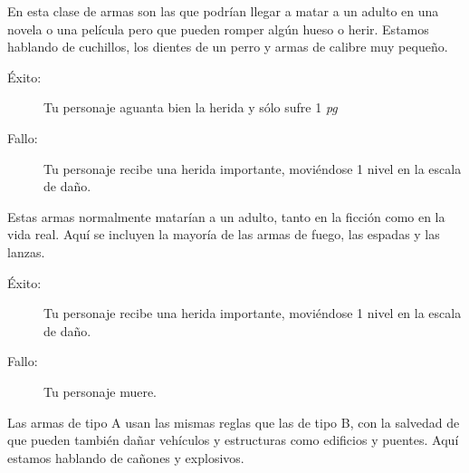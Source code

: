 
En esta clase de armas son las que podrían llegar a matar a un adulto en una novela
o una película pero que pueden romper algún hueso o herir. Estamos hablando de cuchillos, los dientes
de un perro y armas de calibre muy pequeño.

\begin{description}

\item[Éxito:] Tu personaje aguanta bien la herida y sólo sufre 1 \emph{pg}

\item[Fallo:] Tu personaje recibe una herida importante, moviéndose 1 nivel en la escala de daño.

\end{description}


Estas armas normalmente matarían a un adulto, tanto en la ficción como en la vida real. Aquí se incluyen
la mayoría de las armas de fuego, las espadas y las lanzas.

\begin{description}

\item[Éxito:] Tu personaje recibe una herida importante, moviéndose 1 nivel en la escala de daño.

\item[Fallo:] Tu personaje muere.

\end{description}


Las armas de tipo A usan las mismas reglas que las de tipo B, con la salvedad de que pueden también dañar
vehículos y estructuras como edificios y puentes. Aquí estamos hablando de cañones y explosivos.


